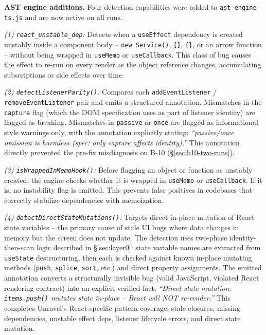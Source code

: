 \documentclass[12pt,a4paper]{article}
\newcommand{\code}[1]{\texttt{\small #1}}
\begin{document}
\textbf{AST engine additions.} Four detection capabilities were added to
\code{ast-engine-ts.js} and are now active on all runs.

\textit{(1) \code{react\_unstable\_dep}:} Detects when a \code{useEffect} dependency
is created unstably inside a component body -- \code{new Service()}, \code{[]},
\code{\{\}}, or an arrow function -- without being wrapped in \code{useMemo} or
\code{useCallback}. This class of bug causes the effect to re-run on every render as
the object reference changes, accumulating subscriptions or side effects over time.

\textit{(2) \code{detectListenerParity()}:} Compares each \code{addEventListener} /
\code{removeEventListener} pair and emits a structured annotation. Mismatches in the
\code{capture} flag (which the DOM specification uses as part of listener identity) are
flagged as breaking. Mismatches in \code{passive} or \code{once} are flagged as
informational style warnings only, with the annotation explicitly stating:
\textit{``passive/once omission is harmless (spec: only capture affects identity).''}
This annotation directly prevented the pre-fix misdiagnosis on B-10 (\S\ref{sec:b10-two-runs}).

\textit{(3) \code{isWrappedInMemoHook()}:} Before flagging an object or function as
unstably created, the engine checks whether it is wrapped in \code{useMemo} or
\code{useCallback}. If it is, no instability flag is emitted. This prevents false
positives in codebases that correctly stabilize dependencies with memoization.

\textit{(4) \code{detectDirectStateMutations()}:} Targets direct in-place mutation of
React state variables -- the primary cause of stale UI bugs where data changes in memory
but the screen does not update. The detection uses two-phase identity-then-scan logic
described in \S\ref{sec:layer0}: state variable names are extracted from \code{useState}
destructuring, then each is checked against known in-place mutating methods (\code{push},
\code{splice}, \code{sort}, etc.) and direct property assignments. The emitted annotation
converts a structurally invisible bug (valid JavaScript, violated React rendering contract)
into an explicit verified fact: \textit{``Direct state mutation: \code{items.push()}
mutates state in-place -- React will NOT re-render.''} This completes Unravel's
React-specific pattern coverage: stale closures, missing dependencies, unstable
effect deps, listener lifecycle errors, and direct state mutation.
\end{document}
